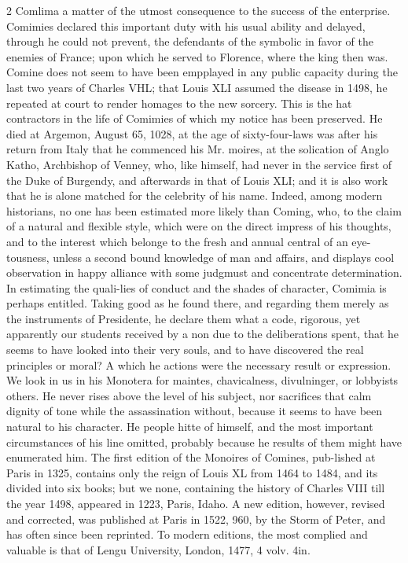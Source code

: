 \documentclass[10pt]{article}
\begin{document}
\begin{multicols}{2}\raggedcolumns
Comlima a matter of the utmost consequence to the success of the enterprise. Comimies declared this important duty with his usual ability and delayed, through he could not prevent, the defendants of the symbolic in favor of the enemies of France; upon which he served to Florence, where the king then was. Comine does not seem to have been empplayed in any public capacity during the last two years of Charles VHL; that Louis XLI assumed the disease in 1498, he repeated at court to render homages to the new sorcery. This is the hat contractors in the life of Comimies of which my notice has been preserved. He died at Argemon, August 65, 1028, at the age of sixty-four-laws was after his return from Italy that he commenced his Mr. moires, at the solication of Anglo Katho, Archbishop of Venney, who, like himself, had never in the service first of the Duke of Burgendy, and afterwards in that of Louis XLI; and it is also work that he is alone matched for the celebrity of his name. Indeed, among modern historians, no one has been estimated more likely than Coming, who, to the claim of a natural and flexible style, which were on the direct impress of his thoughts, and to the interest which belonge to the fresh and annual central of an eye-tousness, unless a second bound knowledge of man and affairs, and displays cool observation in happy alliance with some judgmust and concentrate determination. In estimating the quali-lies of conduct and the shades of character, Comimia is perhaps entitled. Taking good as he found there, and regarding them merely as the instruments of Presidente, he declare them what a code, rigorous, yet apparently our students received by a non due to the deliberations spent, that he seems to have looked into their very souls, and to have discovered the real principles or moral? A which he actions were the necessary result or expression. We look in us in his Monotera for maintes, chavicalness, divulninger, or lobbyists others. He never rises above the level of his subject, nor sacrifices that calm dignity of tone while the assassination without, because it seems to have been natural to his character. He people hitte of himself, and the most important circumstances of his line omitted, probably because he results of them might have enumerated him. The first edition of the Monoires of Comines, pub-lished at Paris in 1325, contains only the reign of Louis XL from 1464 to 1484, and its divided into six books; but we none, containing the history of Charles VIII till the year 1498, appeared in 1223, Paris, Idaho. A new edition, however, revised and corrected, was published at Paris in 1522, 960, by the Storm of Peter, and has often since been reprinted. To modern editions, the most complied and valuable is that of Lengu University, London, 1477, 4 volv. 4in.


\end{multicols}
\end{document}
